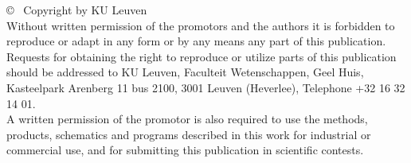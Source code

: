 
\null
\vfill
\copyright~ Copyright by KU Leuven \\

Without written permission of the promotors and the authors it is forbidden to reproduce or adapt in any form or by any means any part of this publication. Requests for obtaining the right to reproduce or utilize parts of this publication should be addressed to KU Leuven, Faculteit Wetenschappen, Geel Huis, Kasteelpark Arenberg 11 bus 2100, 3001 Leuven (Heverlee), Telephone +32 16 32 14 01. \\

A written permission of the promotor is also required to use the methods, products, schematics and programs described in this work for industrial or commercial use, and for submitting this publication in scientific contests.
\cleardoublepage